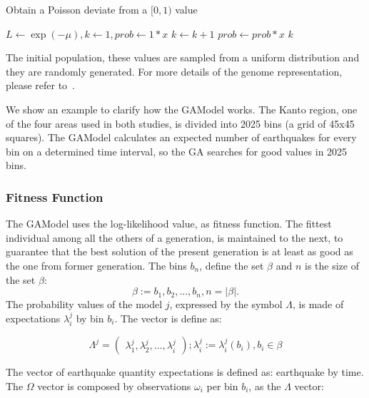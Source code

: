 \begin{algorithm}[H]\label{inversePoisson}
	\caption{Obtain a Poisson deviate from a $[0,1)$ value}
	\begin{algorithmic}
		\STATE $L \gets \exp{(-\mu)}, k \gets 1, prob \gets 1 * x$
		\STATE $k \gets k + 1$
		\STATE $prob \gets prob*x$
		\ENDWHILE
		\RETURN $k$
	\end{algorithmic}
\end{algorithm}

The initial population, these values are sampled from a uniform distribution and they are randomly generated. For more details of the genome representation, please refer to~\cite{ecta14}.

We show an example to clarify how the GAModel works. The Kanto region, one of the four areas used in both studies, is divided into 2025 bins (a grid of 45x45 squares). The GAModel calculates an expected number of earthquakes for every bin on a determined time interval, so the GA searches for good values in 2025 bins.
\subsubsection{Fitness Function}\label{fitGA}

The GAModel uses the log-likelihood value, as fitness
function. The fittest individual among all the others of a generation, is maintained to the next, to guarantee that the best solution of the present generation is at least as good as the one from former generation. The bins $b_n$, define the set $\beta$ and $n$ is the size of the set $\beta$:
\begin{equation} 
\beta := {b_1,b_2,...,b_n},n = |\beta|.
\end{equation}
The probability values of the model $j$, expressed by the symbol
$\Lambda$, is made of expectations $\lambda_i^j$ by bin $b_i$. The
vector is define as:

\begin{equation}
\Lambda^j = 
\begin{pmatrix}
\lambda_1^j, 
\lambda_2^j, 
\hdots,
\lambda_i^j
\end{pmatrix}
;\lambda_i^j := \lambda_i^j(b_i),b_i \in \beta
\end{equation}

The vector of earthquake quantity expectations is defined as:
earthquake by time. The $\Omega$ vector is composed by observations
$\omega_i$ per bin $b_i$, as the $\Lambda$ vector:

